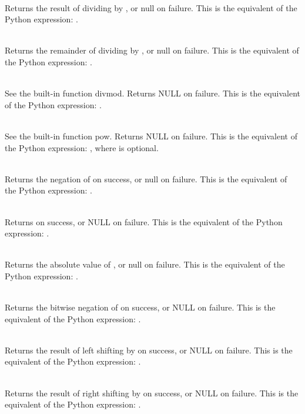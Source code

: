      \\
	 Returns the result of dividing  by , or null on failure.
	 This is the equivalent of the Python expression: .


     \\
	 Returns the remainder of dividing  by , or null on
	 failure.  This is the equivalent of the Python expression:
	 .


     \\
	 See the built-in function divmod.  Returns NULL on failure.
	 This is the equivalent of the Python expression:
	 .


     \\
	 See the built-in function pow.  Returns NULL on failure.
	 This is the equivalent of the Python expression:
	 , where  is optional.


     \\
	 Returns the negation of  on success, or null on failure.
	 This is the equivalent of the Python expression: .


     \\
         Returns  on success, or NULL on failure.
	 This is the equivalent of the Python expression: .


     \\
	 Returns the absolute value of , or null on failure.  This is
	 the equivalent of the Python expression: .


     \\
	 Returns the bitwise negation of  on success, or NULL on
	 failure.  This is the equivalent of the Python expression:
	 .


     \\
	 Returns the result of left shifting  by  on success, or
	 NULL on failure.  This is the equivalent of the Python
	 expression: .


     \\
	 Returns the result of right shifting  by  on success, or
	 NULL on failure.  This is the equivalent of the Python
	 expression: .


